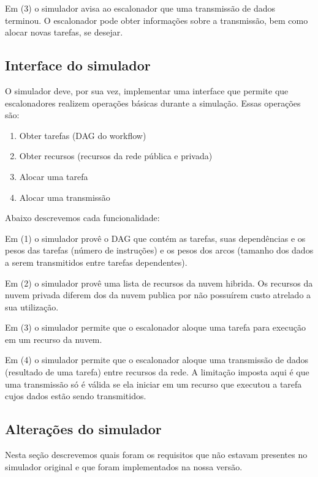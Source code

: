 \documentclass[a4paper,10pt]{article}
\begin{document}
Em (3) o simulador avisa ao escalonador que uma transmissão de dados terminou.
O escalonador pode obter informações sobre a transmissão, bem como alocar novas tarefas, se desejar.

\subsection{Interface do simulador}

O simulador deve, por sua vez, implementar uma interface que permite que escalonadores
realizem operações básicas durante a simulação. Essas operações são:

\begin{enumerate}

  \item Obter tarefas (DAG do workflow)
  \item Obter recursos (recursos da rede pública e privada)
  \item Alocar uma tarefa
  \item Alocar uma transmissão

\end{enumerate}

Abaixo descrevemos cada funcionalidade:

Em (1) o simulador provê o DAG que contém as tarefas, suas dependências e os pesos das tarefas (número
de instruções) e os pesos dos arcos (tamanho dos dados a serem transmitidos entre tarefas dependentes).

Em (2) o simulador provê uma lista de recursos da nuvem hibrida. Os recursos da nuvem privada diferem
dos da nuvem publica por não possuírem custo atrelado a sua utilização.

Em (3) o simulador permite que o escalonador aloque uma tarefa para execução em um recurso da nuvem.

Em (4) o simulador permite que o escalonador aloque uma transmissão de dados (resultado de uma tarefa)
entre recursos da rede. A limitação imposta aqui é que uma transmissão só é válida se ela iniciar em um
recurso que executou a tarefa cujos dados estão sendo transmitidos.

\subsection{Alterações do simulador}

Nesta seção descrevemos quais foram os requisitos que não estavam presentes no simulador original
e que foram implementados na nossa versão.
\end{document}
